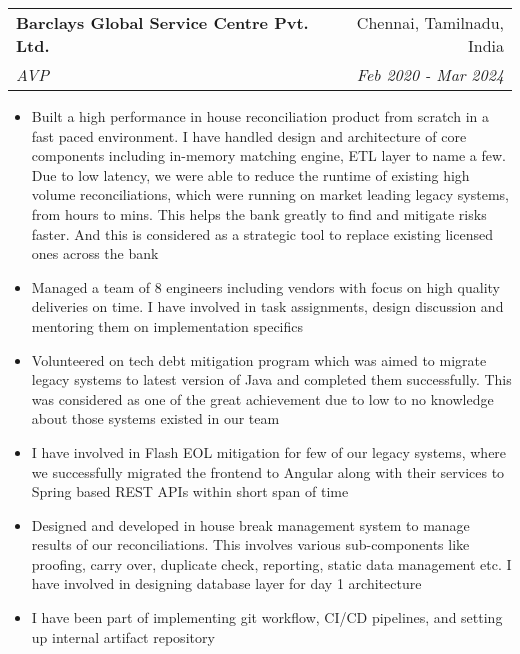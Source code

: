 \documentclass[letterpaper,11pt]{article}
\makeatletter
\newcommand{\resumeItem}[1]{
  \item\small{
    #1
  }
}
\newcommand{\resumeSubheading}[4]{
  \vspace{-1pt}\item
    \begin{tabular*}{0.97\textwidth}[t]{l@{\extracolsep{\fill}}r}
      \textbf{#1} & #2 \\
      \textit{\small#3} & \textit{\small #4} \\
    \end{tabular*}\vspace{-5pt}
}
\newcommand{\resumeSubSubheading}[2]{
    \begin{tabular*}{0.97\textwidth}{l@{\extracolsep{\fill}}r}
      \textit{\small#1} & \textit{\small #2} \\
    \end{tabular*}\vspace{-5pt}
}
\newcommand{\resumeSubHeadingListEnd}{\end{itemize}}
\newcommand{\resumeItemListStart}{\begin{itemize}}
\newcommand{\resumeItemListEnd}{\end{itemize}\vspace{-5pt}}
\makeatother
\begin{document}
    \resumeSubheading
      {Barclays Global Service Centre Pvt. Ltd.}{Chennai, Tamilnadu, India}
      {AVP}{Feb 2020 - Mar 2024}
      \resumeItemListStart
        \resumeItem
          {Built a high performance in house reconciliation product from scratch in a fast paced environment. I have handled design and architecture of core components including in-memory matching engine, ETL layer to name a few. Due to low latency, we were able to reduce the runtime of existing high volume reconciliations, which were running on market leading legacy systems, from hours to mins. This helps the bank greatly to find and mitigate risks faster. And this is considered as a strategic tool to replace existing licensed ones across the bank}
        \resumeItem
          {Managed a team of 8 engineers including vendors with focus on high quality deliveries on time. I have involved in task assignments, design discussion and mentoring them on implementation specifics}
        \resumeItem
          {Volunteered on tech debt mitigation program which was aimed to migrate legacy systems to latest version of Java and completed them successfully. This was considered as one of the great achievement due to low to no knowledge about those systems existed in our team}
        \resumeItem
          {I have involved in Flash EOL mitigation for few of our legacy systems, where we successfully migrated the frontend to Angular along with their services to Spring based REST APIs within short span of time}
        \resumeItem
          {Designed and developed in house break management system to manage results of our reconciliations. This involves various sub-components like proofing, carry over, duplicate check, reporting, static data management etc. I have involved in designing database layer for day 1 architecture}
        \resumeItem
          {I have been part of implementing git workflow, CI/CD pipelines, and setting up internal artifact repository}
        
      \resumeItemListEnd
      
\end{document}
